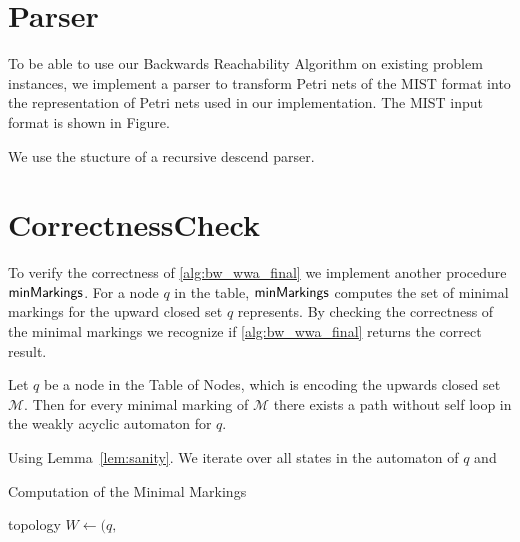 
\section{Parser}
To be able to use our Backwards Reachability Algorithm on existing problem instances, we implement a parser to transform Petri nets of the MIST format into the representation of Petri nets used in our implementation. 
The MIST input format is shown in Figure. 

We use the stucture of a recursive descend parser. 

\section{CorrectnessCheck}
To verify the correctness of \autoref{alg:bw_wwa_final} we implement another procedure $\operatorname{\textsf{minMarkings}}$. For a node $q$ in the table, $\operatorname{\textsf{minMarkings}}$ computes the set of minimal markings for the upward closed set $q$ represents. By checking the correctness of the minimal markings we recognize if \autoref{alg:bw_wwa_final} returns the correct result.

\begin{lemma}\label{lem:sanity}
Let $q$ be a node in the Table of Nodes, which is encoding the upwards closed set $\mathcal{M}$. Then for every minimal marking of $\mathcal{M}$ there exists a path without self loop in the weakly acyclic automaton for $q$.
\end{lemma}

Using Lemma~\autoref{lem:sanity}.
We iterate over all states in the automaton of $q$ and 

\begin{algorithm}[htb]
\caption{Computation of the Minimal Markings}\label{alg:sanity}
\begin{algorithmic}[1]
\State topology 
\State $W \gets (q,$
\EndProcedure
\end{algorithmic}
\end{algorithm}



